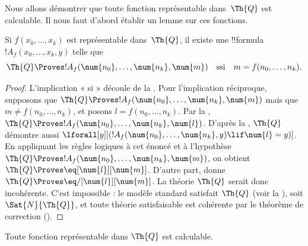 \documentclass[../../../include/open-logic-section]{subfiles}
\begin{document}

Nous allons démontrer que toute fonction représentable dans~$\Th{Q}$
est calculable. Il nous faut d'abord établir un lemme sur ces
fonctions.

\begin{lem}
  Si $f(x_0,\dots,x_k)$ est représentable dans~$\Th{Q}$, il existe
  une !!{formula}~$!A_f(x_0,\dots,x_k,y)$ telle que
  \[
  \Th{Q} \Proves !A_f(\num{n_0}, \dots, \num{n_k}, \num{m})
  \quad\text{ssi}\quad m = f(n_0, \dots, n_k).
  \]
\end{lem}

\begin{proof}
  L'implication « si » découle de la
  .
  Pour l'implication réciproque, supposons que
  $\Th{Q} \Proves !A_f(\num{n_0},\dots,\num{n_k},\num{m})$
  mais que $m\neq f(n_0,\dots,n_k)$, et posons
  $l=f(n_0,\dots,n_k)$. Par la
  ,
  $\Th{Q} \Proves !A_f(\num{n_0},\dots,\num{n_k},\num{l})$.
  D'après la ,
  $\Th{Q}$ démontre aussi
  $\lforall[y][(!A_f(\num{n_0},\dots,\num{n_k},y)\lif\num{l}=y)]$.
  En appliquant les règles logiques à cet énoncé et à l'hypothèse
  $\Th{Q} \Proves !A_f(\num{n_0},\dots,\num{n_k},\num{m})$,
  on obtient $\Th{Q} \Proves \eq[\num{l}][\num{m}]$.
  D'autre part,  donne
  $\Th{Q} \Proves \eq/[\num{l}][\num{m}]$. La théorie $\Th{Q}$
  serait donc incohérente. C'est impossible : le modèle standard
  satisfait $\Th{Q}$ (voir la ),
  soit $\Sat{N}{\Th{Q}}$, et toute théorie satisfaisable est
  cohérente par le théorème de correction
  ().
\end{proof}

\begin{lem}
Toute fonction représentable dans $\Th{Q}$ est calculable.
\end{lem}
\end{document}
